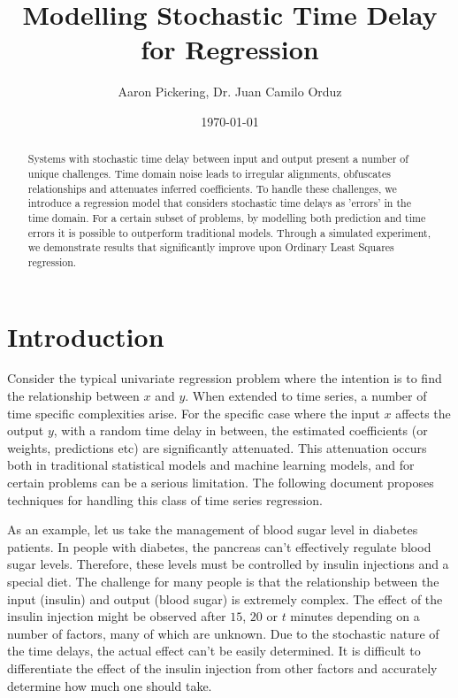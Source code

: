 \documentclass[11pt]{amsart}
\begin{document}
\title{Modelling Stochastic Time Delay for Regression}
\author{Aaron Pickering, Dr. Juan Camilo Orduz}
\date{\today}
\maketitle

\begin{abstract}
Systems with stochastic time delay between input and output present a number of unique challenges. 
Time domain noise leads to irregular alignments, obfuscates relationships and attenuates inferred coefficients. 
To handle these challenges, we introduce a regression model that considers stochastic time delays as 'errors' in the time domain. For a certain subset of problems, by modelling both prediction and time errors it is possible to outperform traditional models.
Through a simulated experiment, we demonstrate results that significantly improve upon Ordinary Least Squares regression.

\end{abstract}

\section{Introduction}

Consider the typical univariate regression problem where the intention is to find the relationship between $x$ and $y$. When extended to time series, a number of time specific complexities arise. For the specific case where the input $x$ affects the output $y$, with a random time delay in between, the estimated coefficients (or weights, predictions etc) are significantly attenuated. This attenuation occurs both in traditional statistical models and machine learning models, and for certain problems can be a serious limitation. The following document proposes techniques for handling this class of time series regression.

As an example, let us take the management of blood sugar level in diabetes patients. In people with diabetes, the pancreas can't effectively regulate blood sugar levels. Therefore, these levels must be controlled by insulin injections and a special diet. The challenge for many people is that the relationship between the input (insulin) and output (blood sugar) is extremely complex. The effect of the insulin injection might be observed after $15$, $20$  or $t$ minutes depending on a number of factors, many of which are unknown. Due to the stochastic nature of the time delays, the actual effect can't be easily determined. It is difficult to differentiate the effect of the insulin injection from other factors and accurately determine how much one should take.
\end{document}
